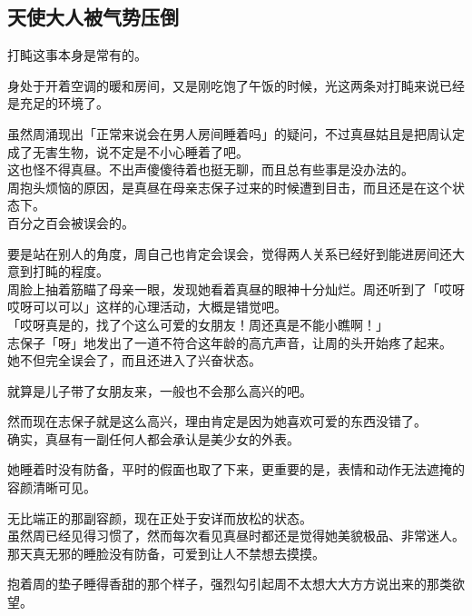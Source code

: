 \subsection{天使大人被气势压倒}

打盹这事本身是常有的。

身处于开着空调的暖和房间，又是刚吃饱了午饭的时候，光这两条对打盹来说已经是充足的环境了。

虽然周涌现出「正常来说会在男人房间睡着吗」的疑问，不过真昼姑且是把周认定成了无害生物，说不定是不小心睡着了吧。\\

这也怪不得真昼。不出声傻傻待着也挺无聊，而且总有些事是没办法的。\\

周抱头烦恼的原因，是真昼在母亲志保子过来的时候遭到目击，而且还是在这个状态下。\\

百分之百会被误会的。

要是站在别人的角度，周自己也肯定会误会，觉得两人关系已经好到能进房间还大意到打盹的程度。\\

周脸上抽着筋瞄了母亲一眼，发现她看着真昼的眼神十分灿烂。周还听到了「哎呀哎呀可以可以」这样的心理活动，大概是错觉吧。\\

「哎呀真是的，找了个这么可爱的女朋友！周还真是不能小瞧啊！」\\

志保子「呀」地发出了一道不符合这年龄的高亢声音，让周的头开始疼了起来。\\

她不但完全误会了，而且还进入了兴奋状态。

就算是儿子带了女朋友来，一般也不会那么高兴的吧。

然而现在志保子就是这么高兴，理由肯定是因为她喜欢可爱的东西没错了。\\

确实，真昼有一副任何人都会承认是美少女的外表。

她睡着时没有防备，平时的假面也取了下来，更重要的是，表情和动作无法遮掩的容颜清晰可见。

无比端正的那副容颜，现在正处于安详而放松的状态。\\

虽然周已经见得习惯了，然而每次看见真昼时都还是觉得她美貌极品、非常迷人。\\

那天真无邪的睡脸没有防备，可爱到让人不禁想去摸摸。

抱着周的垫子睡得香甜的那个样子，强烈勾引起周不太想大大方方说出来的那类欲望。\\

